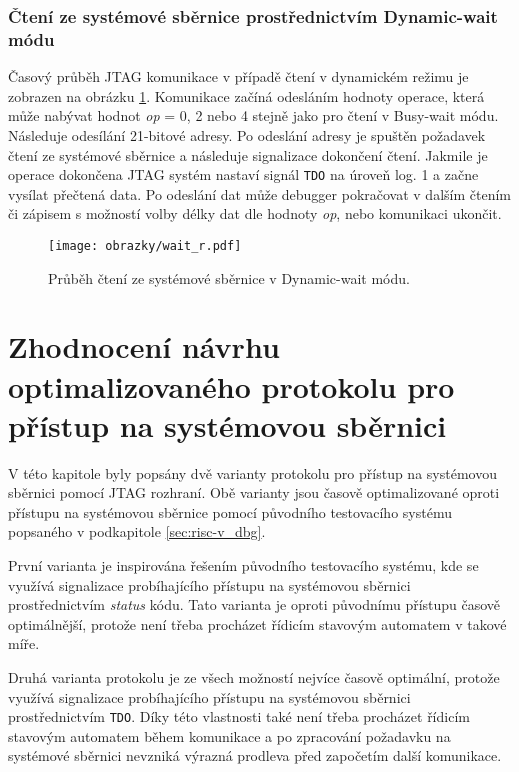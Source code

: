 \subsubsection{Čtení ze systémové sběrnice prostřednictvím Dynamic-wait módu}
Časový průběh JTAG komunikace v případě čtení v dynamickém režimu je zobrazen na obrázku \ref{fig:wait_r}. Komunikace začíná odesláním hodnoty operace, která může nabývat hodnot \textit{op} = 0, 2 nebo 4 stejně jako pro čtení v Busy-wait módu. Následuje odesílání 21-bitové adresy. Po odeslání adresy je spuštěn požadavek čtení ze systémové sběrnice a následuje signalizace dokončení čtení. Jakmile je operace dokončena \acs{JTAG} systém nastaví signál \texttt{\acs{TDO}} na úroveň log. 1 a začne vysílat přečtená data. Po odeslání dat může debugger pokračovat v dalším čtením či zápisem s možností volby délky dat dle hodnoty \textit{op}, nebo komunikaci ukončit. 

\begin{figure}[!h]
  \begin{center}
    \texttt{[image: obrazky/wait\_r.pdf]}
  \end{center}
  \caption{Průběh čtení ze systémové sběrnice v Dynamic-wait módu.}
	\label{fig:wait_r}
\end{figure}

\section{Zhodnocení návrhu optimalizovaného protokolu pro přístup na systémovou sběrnici}
V této kapitole byly popsány dvě varianty protokolu pro přístup na systémovou sběrnici pomocí \acs{JTAG} rozhraní. Obě varianty jsou časově optimalizované oproti přístupu na systémovou sběrnice pomocí původního testovacího systému popsaného v podkapitole \ref{sec:risc-v_dbg}.

První varianta je inspirována řešením původního testovacího systému, kde se využívá signalizace probíhajícího přístupu na systémovou sběrnici prostřednictvím \textit{status} kódu. Tato varianta je oproti původnímu přístupu časově optimálnější, protože není třeba procházet řídicím stavovým automatem
 v takové míře.

Druhá varianta protokolu je ze všech možností nejvíce časově optimální, protože využívá signalizace probíhajícího přístupu na systémovou sběrnici prostřednictvím \texttt{\acs{TDO}}. Díky této vlastnosti také není třeba procházet řídicím stavovým automatem během komunikace a po zpracování požadavku na systémové sběrnici nevzniká výrazná prodleva před započetím další komunikace.


